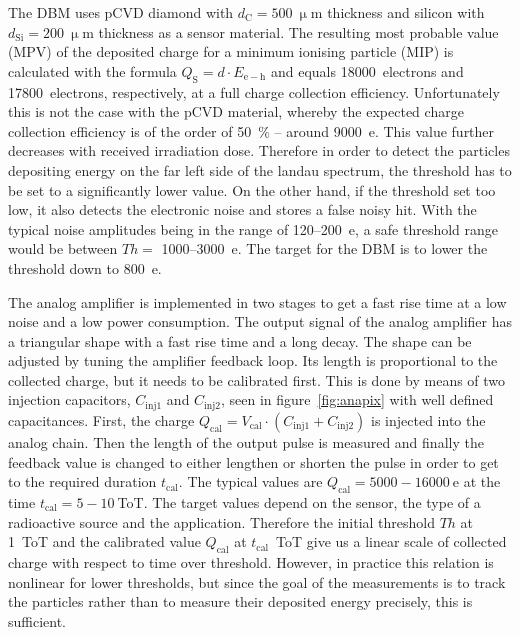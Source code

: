 \documentclass[twoside,12pt]{packages/mytustyle}  %
\begin{document}
The DBM uses pCVD diamond with $d_\mathrm{C}=500~\upmu$m thickness and silicon with $d_\mathrm{Si}=200~\upmu$m thickness as a sensor material. The resulting most probable value (MPV) of the deposited charge for a minimum ionising particle (MIP) is calculated with the formula $Q_\mathrm{S}=d \cdot E_\mathrm{e-h}$ and equals 18000~electrons and 17800~electrons, respectively, at a full charge collection efficiency. Unfortunately this is not the case with the pCVD material, whereby the expected charge collection efficiency is of the order of 50~\%  -- around 9000~e. This value further decreases with received irradiation dose. Therefore in order to detect the particles depositing energy on the far left side of the landau spectrum, the threshold has to be set to a significantly lower value. On the other hand, if the threshold set too low, it also detects the electronic noise and stores a false noisy hit. With the typical noise amplitudes being in the range of 120--200~e, a safe threshold range would be between $Th=$ 1000--3000~e. The target for the DBM is to lower the threshold down to 800~e.

The analog amplifier is implemented in two stages to get a fast rise time at a low noise and a low power consumption. The output signal of the analog amplifier has a triangular shape with a fast rise time and a long decay.  The shape can be adjusted by tuning the amplifier feedback loop. Its length is proportional to the collected charge, but it needs to be calibrated first. This is done by means of two injection capacitors, $C_\mathrm{inj1}$ and $C_\mathrm{inj2}$, seen in figure~\ref{fig:anapix} with well defined capacitances. First, the charge $Q_\mathrm{cal}=V_\mathrm{cal}\cdot(C_\mathrm{inj1}+C_\mathrm{inj2})$ is injected into the analog chain. Then the length of the output pulse is measured and finally the feedback value is changed to either lengthen or shorten the pulse in order to get to the required duration $t_\mathrm{cal}$. The typical values are $Q_\mathrm{cal}=5000-16000~$e at the time $t_\mathrm{cal}=5-10~$ToT. The target values depend on the sensor, the type of a radioactive source and the application. Therefore the initial threshold $Th$ at 1~ToT and the calibrated value $Q_\mathrm{cal}$ at $t_\mathrm{cal}$~ToT give us a linear scale of collected charge with respect to time over threshold.
However, in practice this relation is nonlinear for lower thresholds, but since the goal of the measurements is to track the particles rather than to measure their deposited energy precisely, this is sufficient. 
\end{document}
